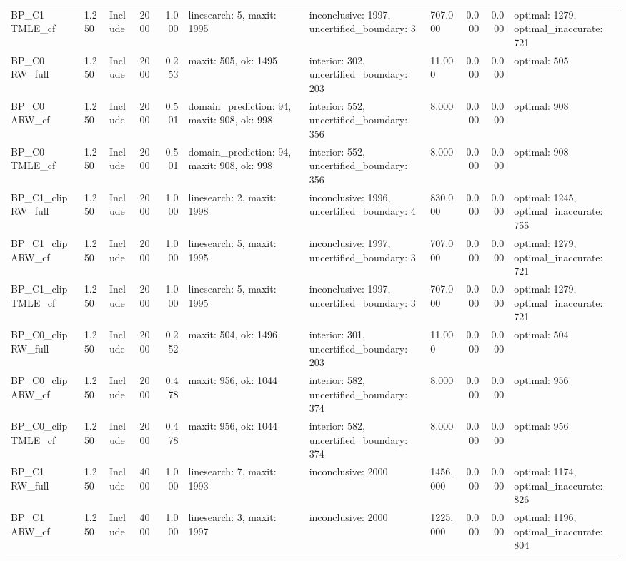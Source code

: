 \begin{tabular}{llllrlllrrl}
BP\_C1 TMLE\_cf & 1.250 & Include & 2000 & 1.000 & linesearch: 5, maxit: 1995 & inconclusive: 1997, uncertified\_boundary: 3 & 707.000 & 0.000 & 0.000 & optimal: 1279, optimal\_inaccurate: 721 \\
BP\_C0 RW\_full & 1.250 & Include & 2000 & 0.253 & maxit: 505, ok: 1495 & interior: 302, uncertified\_boundary: 203 & 11.000 & 0.000 & 0.000 & optimal: 505 \\
BP\_C0 ARW\_cf & 1.250 & Include & 2000 & 0.501 & domain\_prediction: 94, maxit: 908, ok: 998 & interior: 552, uncertified\_boundary: 356 & 8.000 & 0.000 & 0.000 & optimal: 908 \\
BP\_C0 TMLE\_cf & 1.250 & Include & 2000 & 0.501 & domain\_prediction: 94, maxit: 908, ok: 998 & interior: 552, uncertified\_boundary: 356 & 8.000 & 0.000 & 0.000 & optimal: 908 \\
BP\_C1\_clip RW\_full & 1.250 & Include & 2000 & 1.000 & linesearch: 2, maxit: 1998 & inconclusive: 1996, uncertified\_boundary: 4 & 830.000 & 0.000 & 0.000 & optimal: 1245, optimal\_inaccurate: 755 \\
BP\_C1\_clip ARW\_cf & 1.250 & Include & 2000 & 1.000 & linesearch: 5, maxit: 1995 & inconclusive: 1997, uncertified\_boundary: 3 & 707.000 & 0.000 & 0.000 & optimal: 1279, optimal\_inaccurate: 721 \\
BP\_C1\_clip TMLE\_cf & 1.250 & Include & 2000 & 1.000 & linesearch: 5, maxit: 1995 & inconclusive: 1997, uncertified\_boundary: 3 & 707.000 & 0.000 & 0.000 & optimal: 1279, optimal\_inaccurate: 721 \\
BP\_C0\_clip RW\_full & 1.250 & Include & 2000 & 0.252 & maxit: 504, ok: 1496 & interior: 301, uncertified\_boundary: 203 & 11.000 & 0.000 & 0.000 & optimal: 504 \\
BP\_C0\_clip ARW\_cf & 1.250 & Include & 2000 & 0.478 & maxit: 956, ok: 1044 & interior: 582, uncertified\_boundary: 374 & 8.000 & 0.000 & 0.000 & optimal: 956 \\
BP\_C0\_clip TMLE\_cf & 1.250 & Include & 2000 & 0.478 & maxit: 956, ok: 1044 & interior: 582, uncertified\_boundary: 374 & 8.000 & 0.000 & 0.000 & optimal: 956 \\
BP\_C1 RW\_full & 1.250 & Include & 4000 & 1.000 & linesearch: 7, maxit: 1993 & inconclusive: 2000 & 1456.000 & 0.000 & 0.000 & optimal: 1174, optimal\_inaccurate: 826 \\
BP\_C1 ARW\_cf & 1.250 & Include & 4000 & 1.000 & linesearch: 3, maxit: 1997 & inconclusive: 2000 & 1225.000 & 0.000 & 0.000 & optimal: 1196, optimal\_inaccurate: 804 \\

\end{tabular}
